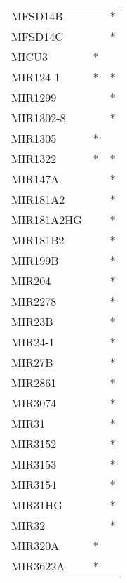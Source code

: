 \begin{longtable}{lcc}
MFSD14B               &                &          * \\
MFSD14C               &                &          * \\
MICU3                 &              * &            \\
MIR124-1              &              * &          * \\
MIR1299               &                &          * \\
MIR1302-8             &                &          * \\
MIR1305               &              * &            \\
MIR1322               &              * &          * \\
MIR147A               &                &          * \\
MIR181A2              &                &          * \\
MIR181A2HG            &                &          * \\
MIR181B2              &                &          * \\
MIR199B               &                &          * \\
MIR204                &                &          * \\
MIR2278               &                &          * \\
MIR23B                &                &          * \\
MIR24-1               &                &          * \\
MIR27B                &                &          * \\
MIR2861               &                &          * \\
MIR3074               &                &          * \\
MIR31                 &                &          * \\
MIR3152               &                &          * \\
MIR3153               &                &          * \\
MIR3154               &                &          * \\
MIR31HG               &                &          * \\
MIR32                 &                &          * \\
MIR320A               &              * &            \\
MIR3622A              &              * &            \\

\end{longtable}

